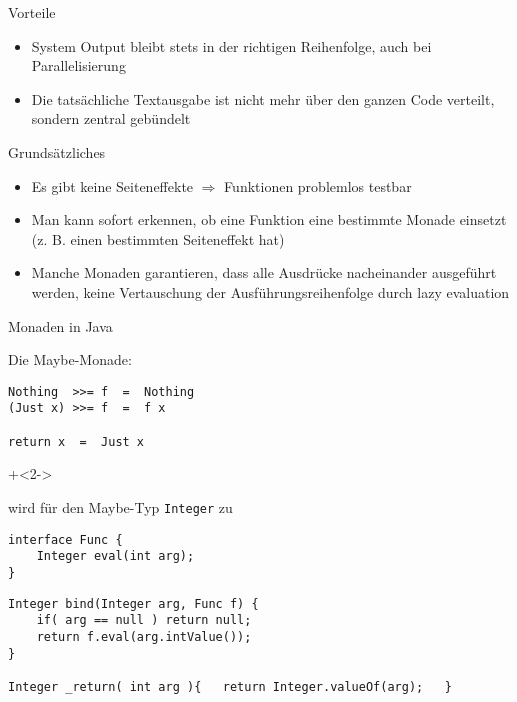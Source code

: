 \begin{frame}[fragile]{Vorteile}

\begin{itemize}
\item System Output bleibt stets in der richtigen Reihenfolge, auch bei Parallelisierung
\item Die tatsächliche Textausgabe ist nicht mehr über den ganzen Code verteilt, sondern zentral gebündelt
\end{itemize}

\end{frame}




\begin{frame}[fragile]{Grundsätzliches}

\begin{itemize}

\item Es gibt keine Seiteneffekte $\Rightarrow$ Funktionen problemlos testbar

\item Man kann sofort erkennen, ob eine Funktion eine bestimmte Monade einsetzt (z. B. einen bestimmten Seiteneffekt hat)

\item Manche Monaden garantieren, dass alle Ausdrücke nacheinander ausgeführt werden, keine Vertauschung der Ausführungsreihenfolge durch lazy evaluation

\end{itemize}


\end{frame}


\begin{frame}[fragile]{Monaden in Java}

Die Maybe-Monade:

\begin{lstlisting}
Nothing  >>= f  =  Nothing
(Just x) >>= f  =  f x

return x  =  Just x
\end{lstlisting}

\onslide+<2->

wird für den Maybe-Typ \lstinline|Integer| zu

\begin{lstlisting}
interface Func {
    Integer eval(int arg);
}
\end{lstlisting}

\begin{lstlisting}
Integer bind(Integer arg, Func f) {
    if( arg == null ) return null;
    return f.eval(arg.intValue());
}

Integer _return( int arg ){   return Integer.valueOf(arg);   }
\end{lstlisting}
\end{frame}


